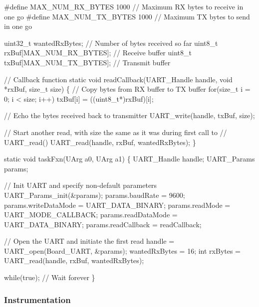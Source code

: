 \begin{DoxyCode}
\textcolor{preprocessor}{#define MAX\_NUM\_RX\_BYTES    1000   // Maximum RX bytes to receive in one go}
\textcolor{preprocessor}{#define MAX\_NUM\_TX\_BYTES    1000   // Maximum TX bytes to send in one go}

uint32\_t wantedRxBytes;            \textcolor{comment}{// Number of bytes received so far}
uint8\_t rxBuf[MAX\_NUM\_RX\_BYTES];   \textcolor{comment}{// Receive buffer}
uint8\_t txBuf[MAX\_NUM\_TX\_BYTES];   \textcolor{comment}{// Transmit buffer}

\textcolor{comment}{// Callback function}
\textcolor{keyword}{static} \textcolor{keywordtype}{void} readCallback(UART_Handle handle, \textcolor{keywordtype}{void} *rxBuf, \textcolor{keywordtype}{size\_t} size)
\{
    \textcolor{comment}{// Copy bytes from RX buffer to TX buffer}
    \textcolor{keywordflow}{for}(\textcolor{keywordtype}{size\_t} i = 0; i < size; i++)
        txBuf[i] = ((uint8\_t*)rxBuf)[i];

    \textcolor{comment}{// Echo the bytes received back to transmitter}
    UART_write(handle, txBuf, size);

    \textcolor{comment}{// Start another read, with size the same as it was during first call to}
    \textcolor{comment}{// UART\_read()}
    UART_read(handle, rxBuf, wantedRxBytes);
\}

\textcolor{keyword}{static} \textcolor{keywordtype}{void} taskFxn(UArg a0, UArg a1)
\{
    UART_Handle handle;
    UART_Params params;

    \textcolor{comment}{// Init UART and specify non-default parameters}
    UART_Params_init(&params);
    params.baudRate      = 9600;
    params.writeDataMode = UART_DATA_BINARY;
    params.readMode      = UART_MODE_CALLBACK;
    params.readDataMode  = UART_DATA_BINARY;
    params.readCallback  = readCallback;

    \textcolor{comment}{// Open the UART and initiate the first read}
    handle = UART_open(Board\_UART, &params);
    wantedRxBytes = 16;
    \textcolor{keywordtype}{int} rxBytes = UART_read(handle, rxBuf, wantedRxBytes);

    \textcolor{keywordflow}{while}(\textcolor{keyword}{true}); \textcolor{comment}{// Wait forever}
\}
\end{DoxyCode}


\subsubsection*{Instrumentation}

